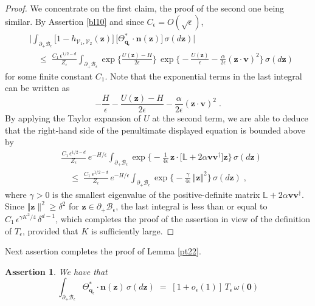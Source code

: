 \documentclass[reqno]{amsart}
\newcounter{as}[section]
\newtheorem{asser}[as]{Assertion}
\newcommand{\mc}[1]{{\mathcal #1}}
\newcommand{\bb}[1]{{\mathbb #1}}
\newcommand{\bs}[1]{{\boldsymbol #1}}
\newcommand{\<}{\langle}
\renewcommand{\>}{\rangle}
\begin{document}
\begin{proof}
We concentrate on the first claim, the proof of the second one being
similar. By Assertion \ref{bl10} and since $C_\epsilon =
O(\sqrt{\epsilon})$,
\begin{align*}
&  \Big|\int_{\partial_{+}\mc{B}_{\epsilon}}
\big[1-h_{\mc{V}_{1},\mc{V}_{2}}(\bs{z})\big] \,
\big[\Theta_{\bs{q}_{\epsilon}}^{*}\cdot\bs{n}(\bs{z})\big]\,
\sigma(d\bs{z})\Big| \\
&  \quad \le\; \frac {C_1 \, \epsilon^{1/2-d}} {Z_{\epsilon}}
\int_{\partial_{+}\mc{B}_{\epsilon}}
\exp\Big\{ \frac{U(\bs{z})-H}{2\epsilon}\Big\} \,
\exp\Big\{ -\frac{U(\bs{z})}{\epsilon}-\frac{\alpha}{2\epsilon}
(\bs{z}\cdot\bs{v})^{2}\Big\} \, \sigma(d\bs{z})
\end{align*}
for some finite constant $C_1$. Note that the exponential terms in the last integral can be written
as
$$-\frac{H}{\epsilon} - \frac{U(\bs{z})-H}{2\epsilon}  - \frac{\alpha}{2\epsilon}
(\bs{z}\cdot\bs{v})^{2}\;.$$
By applying the Taylor expansion of $U$ at the second term, we are able to deduce that the right-hand side of the penultimate displayed equation
is bounded above by
\begin{align*}
& \frac {C_1 \, \epsilon^{1/2-d}} {Z_{\epsilon}} \, e^{- H/\epsilon}
\int_{\partial_{+}\mc{B}_{\epsilon}} \exp\Big\{
-\frac{1}{4\epsilon}\, \bs{z}\cdot
\big[ \bb{L}+2\alpha\bs{v}\bs{v}^{\dagger}\big]\bs{z}\Big\} \, \sigma(d\bs{z})\\
&\quad \le\; \frac {C_1 \, \epsilon^{1/2-d}} {Z_{\epsilon}} \, e^{- H/\epsilon}
\int_{\partial_{+}\mc{B}_{\epsilon}} \exp\Big\{
-\frac{\gamma}{4\epsilon} \, \Vert \bs{z}\Vert^{2}\Big\} \,
\sigma(d\bs{z})\;,
\end{align*}
where $\gamma>0$ is the smallest eigenvalue of the positive-definite
matrix $\bb{L} + 2\alpha\bs{v}\bs{v}^{\dagger}$.  Since $\Vert\bs{z}\|^{2}
\ge \delta^{2}$ for $\bs{z}\in\partial_{+}\mc{B}_{\epsilon}$, the last
integral is less than or equal to $C_1 \, \epsilon^{\gamma K^{2}/4}\,
\delta^{d-1}$, which completes the proof of the assertion in view of
the definition of $T_\epsilon$, provided that $K$ is sufficiently large.
\end{proof}

Next assertion completes the proof of Lemma \ref{pt22}.

\begin{asser}
We have that
\begin{equation*}
\int_{\partial_{+}\mc{B}_{\epsilon}}
\Theta_{\bs{q}_{\epsilon}}^{*}\cdot\bs{n}(\bs{z})
\, \sigma(d\bs{z})\;=\; [1+o_{\epsilon}(1)]\,
T_{\epsilon}\,\omega(\bs{0})
\end{equation*}
\end{asser}
\end{document}
